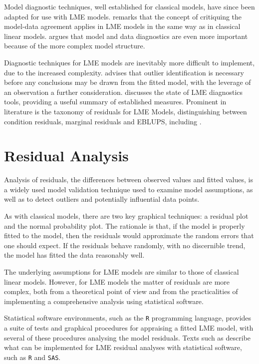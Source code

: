 \documentclass[12pt, a4paper]{report}
\theoremstyle{definition}
\theoremstyle{remark}
\begin{document}
Model diagnostic techniques, well established for classical models, have since been adapted for use with LME models. \citet{schabenberger} remarks that the concept of critiquing the model-data agreement applies in LME models in the same way as in classical linear models. \citet{west} argues that model and data diagnostics are even more important because of the more complex model structure. 


Diagnostic techniques for LME models are inevitably more difficult to implement, due to the increased complexity. \citet{Christensen} advises that outlier identification is necessary before any conclusions may be drawn from the fitted model, with the leverage of an observation a further consideration. \citet{schabenberger} discusses the state of LME diagnostics tools, providing a useful summary of established measures. Prominent in literature is the taxonomy of residuals for LME Models, distinguishing between condition residuals, marginal residuals and EBLUPS, including \citet{hilden1995, schabenberger, west, NobreSinger2007}. 


\section{Residual Analysis}
Analysis of residuals, the differences between observed values and fitted values, is a widely used model validation technique used to examine model assumptions, as well as to detect outliers and potentially influential data points. 

As with classical models, there are two key graphical techniques: a residual plot and the normal probability plot. The rationale is that, if the model is properly fitted to the model, then the residuals would approximate the random errors that one should expect. If the residuals behave randomly, with no discernible trend, the model has fitted the data reasonably well. 

The underlying assumptions for LME models are similar to those of classical linear models. However, for LME models the matter of residuals are more complex, both from a theoretical point of view and from the practicalities of implementing a comprehensive analysis using statistical software.

Statistical software environments, such as the \texttt{R} programming language, provides a suite of tests and graphical procedures for appraising a fitted LME model, with several of these procedures analysing the model residuals. Texts such as \citet{PB,west,Galecki} describe what can be implemented for LME residual analyses with statistical software, such as \texttt{R} and \texttt{SAS}.
\end{document}
